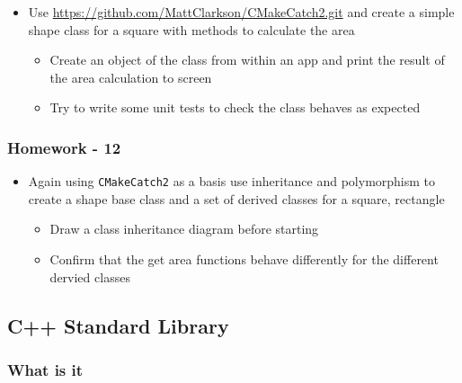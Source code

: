 \begin{itemize}
\tightlist
\item
  Use \url{https://github.com/MattClarkson/CMakeCatch2.git} and create a
  simple shape class for a square with methods to calculate the area

  \begin{itemize}
  \tightlist
  \item
    Create an object of the class from within an app and print the
    result of the area calculation to screen
  \item
    Try to write some unit tests to check the class behaves as expected
  \end{itemize}
\end{itemize}

\hypertarget{homework---12}{%
\subsubsection{Homework - 12}\label{homework---12}}

\begin{itemize}
\tightlist
\item
  Again using \texttt{CMakeCatch2} as a basis use inheritance and
  polymorphism to create a shape base class and a set of derived classes
  for a square, rectangle

  \begin{itemize}
  \tightlist
  \item
    Draw a class inheritance diagram before starting
  \item
    Confirm that the get area functions behave differently for the
    different dervied classes
  \end{itemize}
\end{itemize}

\hypertarget{c-standard-library}{%
\subsection{C++ Standard Library}\label{c-standard-library}}

\hypertarget{what-is-it}{%
\subsubsection{What is it}\label{what-is-it}}

